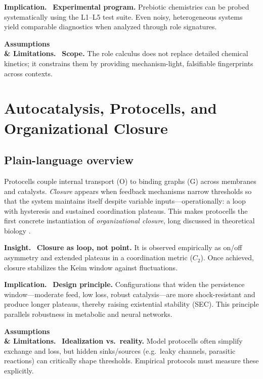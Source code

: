 \documentclass[12pt,a4paper,oneside]{scrreprt}
\newenvironment{insight}{\par\vspace{0.5em}\noindent\textbf{Insight.}\ }{\par\vspace{0.5em}}
\newenvironment{implication}{\par\vspace{0.5em}\noindent\textbf{Implication.}\ }{\par\vspace{0.5em}}
\newenvironment{limitation}{\par\vspace{0.5em}\noindent\textbf{Assumptions \\ \& Limitations.}\ }{\par\vspace{0.5em}}
\begin{document}
\begin{implication}
\textbf{Experimental program.} 
Prebiotic chemistries can be probed systematically 
using the L1--L5 test suite. 
Even noisy, heterogeneous systems yield comparable diagnostics 
when analyzed through role signatures. 
\end{implication}

\begin{limitation}
\textbf{Scope.} 
The role calculus does not replace detailed chemical kinetics; 
it constrains them by providing mechanism-light, 
falsifiable fingerprints across contexts. 
\end{limitation}

\chapter{Autocatalysis, Protocells, and Organizational Closure}\label{ch:life-closure}

\section*{Plain-language overview}
Protocells couple internal transport (O) to binding graphs (G) across membranes and catalysts. 
\emph{Closure} appears when feedback mechanisms narrow thresholds so that the system maintains itself despite variable inputs—operationally: a loop with hysteresis and sustained coordination plateaus. 
This makes protocells the first concrete instantiation of \emph{organizational closure}, 
long discussed in theoretical biology \citep{Varela1974Autopoiesis,Maturana1980Autopoiesis,Luisi2006Protocells}.

\begin{insight}
\textbf{Closure as loop, not point.} 
It is observed empirically as on/off asymmetry and extended plateaus in a coordination metric ($C_2$). 
Once achieved, closure stabilizes the Keim window against fluctuations. 
\end{insight}

\begin{implication}
\textbf{Design principle.} 
Configurations that widen the persistence window—moderate feed, low loss, robust catalysis—are more shock-resistant and produce longer plateaus, 
thereby raising existential stability (SEC). 
This principle parallels robustness in metabolic and neural networks. 
\end{implication}

\begin{limitation}
\textbf{Idealization vs.\ reality.} 
Model protocells often simplify exchange and loss, 
but hidden sinks/sources (e.g.\ leaky channels, parasitic reactions) 
can critically shape thresholds. 
Empirical protocols must measure these explicitly. 
\end{limitation}
\end{document}
